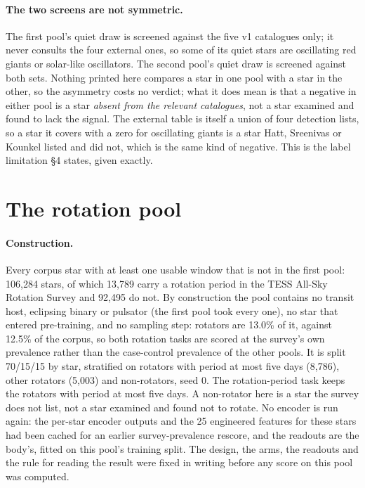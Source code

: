 \documentclass{article}
\begin{document}
\paragraph{The two screens are not symmetric.} The first pool's quiet draw is screened against the
five v1 catalogues only; it never consults the four external ones, so some of its quiet stars are
oscillating red giants or solar-like oscillators. The second pool's quiet draw is screened against
both sets. Nothing printed here compares a star in one pool with a star in the other, so the
asymmetry costs no verdict; what it does mean is that a negative in either pool is a star
\emph{absent from the relevant catalogues}, not a star examined and found to lack the signal. The
external table is itself a union of four detection lists, so a star it covers with a zero for
oscillating giants is a star Hatt, Sreenivas or Kounkel listed and \citet{hon2021} did not, which is
the same kind of negative. This is the label limitation \S4 states, given exactly.

\section{The rotation pool}
\label{app:rotpool}

\paragraph{Construction.} Every corpus star with at least one usable window that is not in the
first pool: 106{,}284 stars, of which 13{,}789 carry a rotation period in the TESS All-Sky Rotation
Survey \citep{boyle2026} and 92{,}495 do not. By construction the pool contains no transit host,
eclipsing binary or pulsator (the first pool took every one), no star that entered pre-training, and
no sampling step: rotators are 13.0\% of it, against 12.5\% of the corpus, so both rotation tasks are
scored at the survey's own prevalence rather than the case-control prevalence of the other pools. It
is split 70/15/15 by star, stratified on rotators with period at most five days (8{,}786), other
rotators (5{,}003) and non-rotators, seed 0. The rotation-period task keeps the rotators with period
at most five days. A non-rotator here is a star the survey does not list, not a star examined and
found not to rotate. No encoder is run again: the per-star encoder outputs and the 25 engineered
features for these stars had been cached for an earlier survey-prevalence rescore, and the readouts
are the body's, fitted on this pool's training split. The design, the arms, the readouts and the rule
for reading the result were fixed in writing before any score on this pool was computed.
\end{document}
